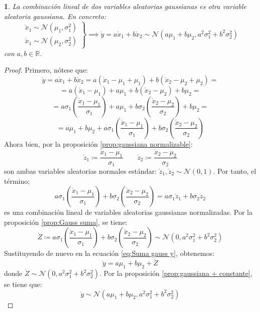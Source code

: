 \documentclass[11pt,a4paper,spanish]{article}
\numberwithin{equation}{section}
\numberwithin{table}{section}
\numberwithin{figure}{section}
\theoremstyle{definition}
\theoremstyle{remark}
\theoremstyle{definition}
\theoremstyle{remark}
\theoremstyle{plain}
\theoremstyle{plain}
\theoremstyle{plain}
\newtheorem{cor}{\protect\corollaryname}[section]
\theoremstyle{plain}
\theoremstyle{plain}
\theoremstyle{plain}
\providecommand{\corollaryname}{Corolario}
\begin{document}
	\begin{cor}
		\label{cor:Suma gauss 2}La combinación lineal de dos variables aleatorias
		gaussianas es otra variable aleatoria gaussiana. En concreto:
		\[
		\left.\begin{matrix}\mathring{x}_{1}\sim\mathcal{N}\left(\mu_{1},\sigma_{1}^{2}\right)\\
			\mathring{x}_{1}\sim\mathcal{N}\left(\mu_{2},\sigma_{2}^{2}\right)
		\end{matrix}\right\} \implies\mathring{y}=a\mathring{x}_{1}+b\mathring{x}_{2}\sim\mathcal{N}\left(a\mu_{1}+b\mu_{2},a^{2}\sigma_{1}^{2}+b^{2}\sigma_{2}^{2}\right)
		\]
		con $a,b\in\mathbb{R}$.
	\end{cor}
	\begin{proof}
		Primero, nótese que:
		\[
		\mathring{y}=a\mathring{x}_{1}+b\mathring{x}_{2}=a\left(\mathring{x}_{1}-\mu_{1}+\mu_{1}\right)+b\left(\mathring{x}_{2}-\mu_{2}+\mu_{2}\right)=
		\]
		\[
		=a\left(\mathring{x}_{1}-\mu_{1}\right)+a\mu_{1}+b\left(\mathring{x}_{2}-\mu_{2}\right)+b\mu_{2}=
		\]
		\[
		=a\sigma_{1}\left(\frac{\mathring{x}_{1}-\mu_{1}}{\sigma_{1}}\right)+a\mu_{1}+b\sigma_{2}\left(\frac{\mathring{x}_{2}-\mu_{2}}{\sigma_{2}}\right)+b\mu_{2}=
		\]
		\begin{equation}
			=a\mu_{1}+b\mu_{2}+a\sigma_{1}\left(\frac{\mathring{x}_{1}-\mu_{1}}{\sigma_{1}}\right)+b\sigma_{2}\left(\frac{\mathring{x}_{2}-\mu_{2}}{\sigma_{2}}\right)\label{eq:Suma gauss y}
		\end{equation}
		Ahora bien, por la proposición \vref{prop:gaussiana normalizable}:
		\[
		\mathring{z}_{1}\coloneqq\frac{\mathring{x}_{1}-\mu_{1}}{\sigma_{1}}\qquad\mathring{z}_{2}\coloneqq\frac{\mathring{x}_{2}-\mu_{2}}{\sigma_{2}}
		\]
		son ambas variables aleatorias normales estándar: $\mathring{z}_{1},\mathring{z}_{2}\sim\mathcal{N}\left(0,1\right)$.
		Por tanto, el término;
		\[
		a\sigma_{1}\left(\frac{\mathring{x}_{1}-\mu_{1}}{\sigma_{1}}\right)+b\sigma_{2}\left(\frac{\mathring{x}_{2}-\mu_{2}}{\sigma_{2}}\right)=a\sigma_{1}\mathring{z}_{1}+b\sigma_{2}\mathring{z}_{2}
		\]
		es una combinación lineal de variables aleatorias gaussianas normalizadas.
		Por la proposición \vref{prop:Gauss suma}, se tiene:
		\[
		\mathring{Z}\coloneqq a\sigma_{1}\left(\frac{\mathring{x}_{1}-\mu_{1}}{\sigma_{1}}\right)+b\sigma_{2}\left(\frac{\mathring{x}_{2}-\mu_{2}}{\sigma_{2}}\right)\sim\mathcal{N}\left(0,a^{2}\sigma_{1}^{2}+b^{2}\sigma_{2}^{2}\right)
		\]
		Sustituyendo de nuevo en la ecuación \vref{eq:Suma gauss y}, obtenemos:
		\[
		\mathring{y}=a\mu_{1}+b\mu_{2}+\mathring{Z}
		\]
		donde $\mathring{Z}\sim\mathcal{N}\left(0,a^{2}\sigma_{1}^{2}+b^{2}\sigma_{2}^{2}\right)$.
		Por la proposición \vref{prop:gaussiana + constante}, se tiene que:
		\[
		\mathring{y}\sim\mathcal{N}\left(a\mu_{1}+b\mu_{2},a^{2}\sigma_{1}^{2}+b^{2}\sigma_{2}^{2}\right)
		\]
	\end{proof}
\end{document}
